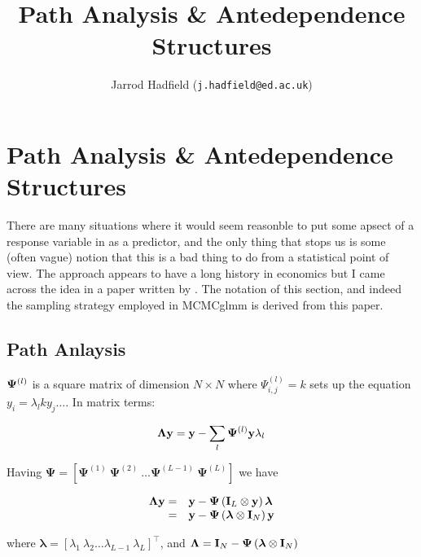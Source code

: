 \documentclass{article}
\title{Path Analysis \& Antedependence Structures}
\author{Jarrod Hadfield (\texttt{j.hadfield@ed.ac.uk})}
\begin{document}
\maketitle
\else
\chapter{Path Analysis \& Antedependence Structures}
\label{SandR}
\fi


There are many situations where it would seem reasonble to put some apsect of a response variable in as a predictor, and the only thing that stops us is some (often vague) notion that this is a bad thing to do from a statistical point of view. The approach appears to have a long history in economics but I came across the idea in a paper written by  \citet{Gianola.2004}. The notation of this section, and indeed the sampling strategy employed in MCMCglmm is derived from this paper.\\

\section{Path Anlaysis}

${\bf \Psi}^{(l)}$ is a square matrix of dimension $N \times N$ where $\Psi_{i,j}^{(l)}=k$ sets up the equation $y_{i} = \lambda_{l}ky_{j} \dots$. In matrix terms:

\begin{equation}
{\bm \Lambda}{\bf y} = {\bf y} - \sum_{l}{\bf \Psi}^{(l)}{\bf y}{\lambda_{l}}
\end{equation}

Having ${\bm \Psi} = \left[{\bm \Psi}^{(1)}\ {\bm \Psi}^{(2)}\ \dots {\bm \Psi}^{(L-1)}\ {\bm \Psi}^{(L)}\right]$ we have 

\begin{equation}
\begin{array}{rl}
{\bm \Lambda}{\bf y} =& {\bf y}-{\bm \Psi}\left({\bf I}_{L} \otimes {\bf y} \right){\bm \lambda}\\
                     =& {\bf y}-{\bm \Psi}\left({\bm \lambda}\otimes {\bf I}_{N}\right) {\bf y}\\
\end{array}
\label{rs-Eq}
\end{equation}

where ${\bm \lambda} = \left[\lambda_{1}\ \lambda_{2} \dots \lambda_{L-1}\ \lambda_{L} \right]^{\top}$, and ${\bm \Lambda}={\bf I}_{N}-{\bm \Psi}\left({\bm \lambda}\otimes {\bf I}_{N}\right)$\\
\end{document}
